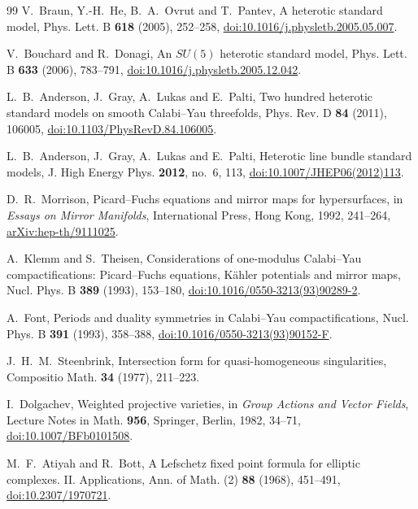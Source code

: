 \documentclass[11pt]{amsart}
\theoremstyle{definition}
\theoremstyle{remark}
\begin{document}
\begin{thebibliography}{99}
V.~Braun, Y.-H.~He, B.~A.~Ovrut and T.~Pantev, A heterotic standard model,
Phys. Lett. B \textbf{618} (2005), 252--258,
\href{https://doi.org/10.1016/j.physletb.2005.05.007}{doi:10.1016/j.physletb.2005.05.007}.

V.~Bouchard and R.~Donagi, An $SU(5)$ heterotic standard model, Phys. Lett.
B \textbf{633} (2006), 783--791,
\href{https://doi.org/10.1016/j.physletb.2005.12.042}{doi:10.1016/j.physletb.2005.12.042}.

L.~B.~Anderson, J.~Gray, A.~Lukas and E.~Palti, Two hundred heterotic
standard models on smooth Calabi--Yau threefolds, Phys. Rev. D \textbf{84}
(2011), 106005,
\href{https://doi.org/10.1103/PhysRevD.84.106005}{doi:10.1103/PhysRevD.84.106005}.

L.~B.~Anderson, J.~Gray, A.~Lukas and E.~Palti, Heterotic line bundle
standard models, J. High Energy Phys. \textbf{2012}, no.~6, 113,
\href{https://doi.org/10.1007/JHEP06(2012)113}{doi:10.1007/JHEP06(2012)113}.

D.~R.~Morrison, Picard--Fuchs equations and mirror maps for hypersurfaces,
in \emph{Essays on Mirror Manifolds}, International Press, Hong Kong, 1992,
241--264, \href{https://arxiv.org/abs/hep-th/9111025}{arXiv:hep-th/9111025}.

A.~Klemm and S.~Theisen, Considerations of one-modulus Calabi--Yau
compactifications: Picard--Fuchs equations, K\"ahler potentials and mirror
maps, Nucl. Phys. B \textbf{389} (1993), 153--180,
\href{https://doi.org/10.1016/0550-3213(93)90289-2}{doi:10.1016/0550-3213(93)90289-2}.

A.~Font, Periods and duality symmetries in Calabi--Yau compactifications,
Nucl. Phys. B \textbf{391} (1993), 358--388,
\href{https://doi.org/10.1016/0550-3213(93)90152-F}{doi:10.1016/0550-3213(93)90152-F}.

J.~H.~M.~Steenbrink, Intersection form for quasi-homogeneous singularities,
Compositio Math. \textbf{34} (1977), 211--223.

I.~Dolgachev, Weighted projective varieties, in \emph{Group Actions and
Vector Fields}, Lecture Notes in Math. \textbf{956}, Springer, Berlin,
1982, 34--71,
\href{https://doi.org/10.1007/BFb0101508}{doi:10.1007/BFb0101508}.

M.~F.~Atiyah and R.~Bott, A Lefschetz fixed point formula for elliptic
complexes. II. Applications, Ann. of Math. (2) \textbf{88} (1968),
451--491,
\href{https://doi.org/10.2307/1970721}{doi:10.2307/1970721}.


\end{thebibliography}
\end{document}
